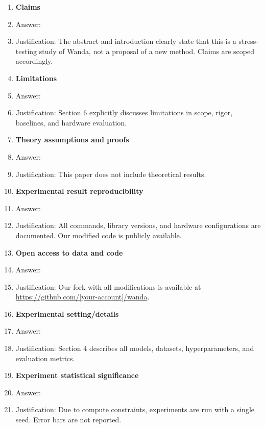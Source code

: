 \documentclass{article}
\begin{document}
\begin{enumerate}

\item {\bf Claims}
    \item[] Answer: \answerYes{}
    \item[] Justification: The abstract and introduction clearly state that
    this is a stress-testing study of Wanda, not a proposal of a new method.
    Claims are scoped accordingly.

\item {\bf Limitations}
    \item[] Answer: \answerYes{}
    \item[] Justification: Section 6 explicitly discusses limitations in scope,
    rigor, baselines, and hardware evaluation.

\item {\bf Theory assumptions and proofs}
    \item[] Answer: \answerNA{}
    \item[] Justification: This paper does not include theoretical results.

\item {\bf Experimental result reproducibility}
    \item[] Answer: \answerYes{}
    \item[] Justification: All commands, library versions, and hardware
    configurations are documented. Our modified code is publicly available.

\item {\bf Open access to data and code}
    \item[] Answer: \answerYes{}
    \item[] Justification: Our fork with all modifications is available at
    \url{https://github.com/[your-account]/wanda}.

\item {\bf Experimental setting/details}
    \item[] Answer: \answerYes{}
    \item[] Justification: Section 4 describes all models, datasets,
    hyperparameters, and evaluation metrics.

\item {\bf Experiment statistical significance}
    \item[] Answer: \answerNo{}
    \item[] Justification: Due to compute constraints, experiments are run
    with a single seed. Error bars are not reported.


\end{enumerate}
\end{document}
